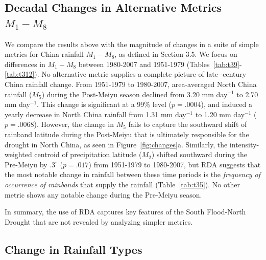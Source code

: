 \documentclass{ametsoc}
\begin{document}
\subsection{Decadal Changes in Alternative Metrics $M_1-M_8$}

	We compare the results above with the magnitude of changes in a suite of simple metrics for China rainfall $M_1-M_8$, as defined in Section 3.5. We focus on differences in $M_1-M_8$ between 1980-2007 and 1951-1979 (Tables~\ref{tab:t39}-\ref{tab:t312}). No alternative metric supplies a complete picture of late--century China rainfall change. From 1951-1979 to 1980-2007, area-averaged North China rainfall ($M_5$) during the Post-Meiyu season declined from 3.20 mm day$^{-1}$ to 2.70 mm day$^{-1}$. This change is significant at a 99\% level ($p=.0004$), and induced a yearly decrease in North China rainfall from 1.31 mm day$^{-1}$ to 1.20 mm day$^{-1}$  ($p=.0068$). However, the change in $M_5$ fails to capture the southward shift of rainband latitude during the Post-Meiyu that is ultimately responsible for the drought in North China, as seen in Figure~\ref{fig:changes}a. Similarly, the intensity-weighted centroid of precipitation latitude ($M_2$) shifted southward during the Pre-Meiyu by $.3^\circ$ ($p=.017$) from 1951-1979 to 1980-2007, but RDA suggests that the most notable change in rainfall between these time periods is the \textit{frequency of occurrence of rainbands} that supply the rainfall (Table~\ref{tab:t35}). No other metric shows any notable change during the Pre-Meiyu season. 
	
	In summary, the use of RDA captures key features of the South Flood-North Drought that are not revealed by analyzing simpler metrics.

\subsection{Change in Rainfall Types}
\end{document}
